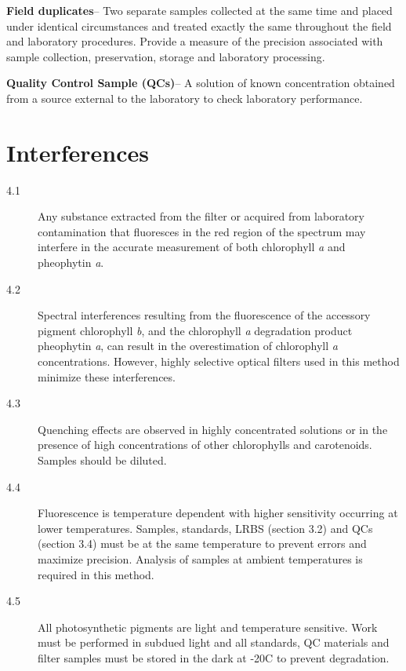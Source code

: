 \documentclass[12pt]{../SOP2}
\begin{document}
\NP \textbf{Field duplicates}-- Two separate samples collected at the same time and placed under identical circumstances and treated exactly the same throughout the field and laboratory procedures. Provide a measure of the precision associated with sample collection, preservation, storage and laboratory processing. 

\NP \textbf{Quality Control Sample (QCs)}-- A solution of known concentration obtained from a source external to the laboratory to check laboratory performance.  


\section{Interferences}
\begin{description}
\item[4.1] Any substance extracted from the filter or acquired from laboratory contamination that fluoresces in the red region of the spectrum may interfere in the accurate measurement of both chlorophyll \textit{a} and pheophytin \textit{a}.
\item[4.2] Spectral interferences resulting from the fluorescence of the accessory pigment chlorophyll \textit{b}, and the chlorophyll \textit{a} degradation product pheophytin \textit{a}, can result in the overestimation of chlorophyll \textit{a} concentrations. However, highly selective optical filters used in this method minimize these interferences. 
\item[4.3] Quenching effects are observed in highly concentrated solutions or in the presence of high concentrations of other chlorophylls and carotenoids. Samples should be diluted. 
\item[4.4] Fluorescence is temperature dependent with higher sensitivity occurring at lower temperatures. Samples, standards, LRBS (section 3.2) and QCs (section 3.4) must be at the same temperature to prevent errors and maximize precision. Analysis of samples at ambient temperatures is required in this method. 
\item[4.5] All photosynthetic pigments are light and temperature sensitive. Work must be performed in subdued light and all standards, QC materials and filter samples must be stored in the dark at -20\degree C to prevent degradation.
\end{description}
\end{document}
